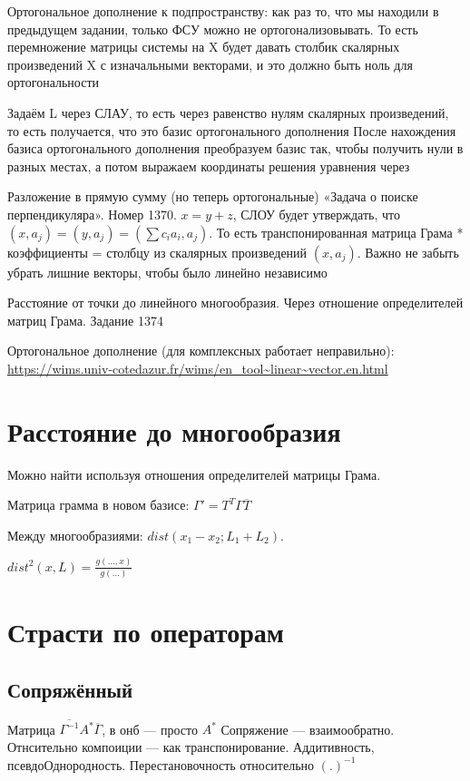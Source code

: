 \documentclass[12pt, a4paper]{article}
\begin{document}
    Ортогональное дополнение к подпространству: как раз то, что мы находили в предыдущем задании, только ФСУ можно не ортогонализовывать. То есть перемножение матрицы системы на X будет давать столбик скалярных произведений X с изначальными векторами, и это должно быть ноль для ортогональности
    
    Задаём L через СЛАУ, то есть через равенство нулям скалярных произведений, то есть получается, что это базис ортогонального дополнения
    После нахождения базиса ортогонального дополнения преобразуем базис так, чтобы получить нули в разных местах, а потом выражаем координаты решения уравнения через
    
    Разложение в прямую сумму (но теперь ортогональные) «Задача о поиске перпендикуляра». Номер 1370. $x = y + z$, 
    СЛОУ будет утверждать, что $(x, a_j) = (y, a_j) = (\sum {c_i a_i},  a_j)$. 
    То есть транспонированная матрица Грама * коэффициенты = столбцу из скалярных произведений $(x, a_j)$. 
    Важно не забыть убрать лишние векторы, чтобы было линейно независимо
    
    Расстояние от точки до линейного многообразия. Через отношение определителей матриц Грама. Задание 1374

    Ортогональное дополнение (для комплексных работает неправильно):
    \url{https://wims.univ-cotedazur.fr/wims/en_tool~linear~vector.en.html}


    \section{Расстояние до многообразия}

    Можно найти используя отношения определителей матрицы Грама.

    Матрица грамма в новом базисе: $\Gamma' = T^T \Gamma \overline{T}$

    Между многообразиями: $dist(x_1 - x_2; L_1 + L_2)$.

    $dist^2(x, L) = \frac{g(…, x)}{g(…)}$

    \section{Страсти по операторам}

    \subsection{Сопряжённый}

    Матрица $\overline{\Gamma^{-1}} A^* \overline{\Gamma}$, в онб — просто $A^*$
    Сопряжение — взаимообратно.
    Отнсительно компоиции — как транспонирование.
    Аддитивность, псевдоОднородность.
    Перестановочность относительно $(.)^{-1}$
\end{document}
